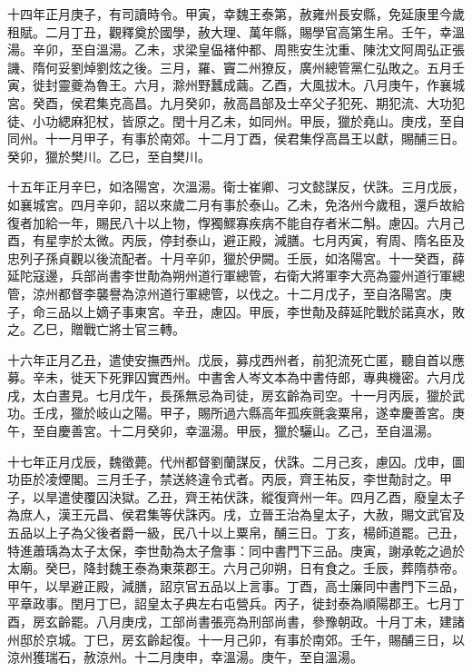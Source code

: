 \begin{pinyinscope}
 十四年正月庚子，有司讀時令。甲寅，幸魏王泰第，赦雍州長安縣，免延康里今歲租賦。二月丁丑，觀釋奠於國學，赦大理、萬年縣，賜學官高第生帛。壬午，幸溫湯。辛卯，至自溫湯。乙未，求梁皇偘褚仲都、周熊安生沈重、陳沈文阿周弘正張譏、隋何妥劉焯劉炫之後。三月，羅、竇二州獠反，廣州總管黨仁弘敗之。五月壬寅，徙封靈夔為魯王。六月，滁州野蠶成繭。乙酉，大風拔木。八月庚午，作襄城宮。癸酉，侯君集克高昌。九月癸卯，赦高昌部及士卒父子犯死、期犯流、大功犯徒、小功緦麻犯杖，皆原之。閏十月乙未，如同州。甲辰，獵於堯山。庚戌，至自同州。十一月甲子，有事於南郊。十二月丁酉，侯君集俘高昌王以獻，賜酺三日。癸卯，獵於樊川。乙巳，至自樊川。



 十五年正月辛巳，如洛陽宮，次溫湯。衛士崔卿、刁文懿謀反，伏誅。三月戊辰，如襄城宮。四月辛卯，詔以來歲二月有事於泰山。乙未，免洛州今歲租，還戶故給復者加給一年，賜民八十以上物，惸獨鰥寡疾病不能自存者米二斛。慮囚。六月己酉，有星孛於太微。丙辰，停封泰山，避正殿，減膳。七月丙寅，宥周、隋名臣及忠列子孫貞觀以後流配者。十月辛卯，獵於伊闕。壬辰，如洛陽宮。十一癸酉，薛延陀寇邊，兵部尚書李世勣為朔州道行軍總管，右衛大將軍李大亮為靈州道行軍總管，涼州都督李襲譽為涼州道行軍總管，以伐之。十二月戊子，至自洛陽宮。庚子，命三品以上嫡子事東宮。辛丑，慮囚。甲辰，李世勣及薛延陀戰於諾真水，敗之。乙巳，贈戰亡將士官三轉。



 十六年正月乙丑，遣使安撫西州。戊辰，募戍西州者，前犯流死亡匿，聽自首以應募。辛未，徙天下死罪囚實西州。中書舍人岑文本為中書侍郎，專典機密。六月戊戌，太白晝見。七月戊午，長孫無忌為司徒，房玄齡為司空。十一月丙辰，獵於武功。壬戌，獵於岐山之陽。甲子，賜所過六縣高年孤疾氈衾粟帛，遂幸慶善宮。庚午，至自慶善宮。十二月癸卯，幸溫湯。甲辰，獵於驪山。乙己，至自溫湯。



 十七年正月戊辰，魏徵薨。代州都督劉蘭謀反，伏誅。二月己亥，慮囚。戊申，圖功臣於凌煙閣。三月壬子，禁送終違令式者。丙辰，齊王祐反，李世勣討之。甲子，以旱遣使覆囚決獄。乙丑，齊王祐伏誅，縱復齊州一年。四月乙酉，廢皇太子為庶人，漢王元昌、侯君集等伏誅丙。戌，立晉王治為皇太子，大赦，賜文武官及五品以上子為父後者爵一級，民八十以上粟帛，酺三日。丁亥，楊師道罷。己丑，特進蕭瑀為太子太保，李世勣為太子詹事：同中書門下三品。庚寅，謝承乾之過於太廟。癸巳，降封魏王泰為東萊郡王。六月己卯朔，日有食之。壬辰，葬隋恭帝。甲午，以旱避正殿，減膳，詔京官五品以上言事。丁酉，高士廉同中書門下三品，平章政事。閏月丁巳，詔皇太子典左右屯營兵。丙子，徙封泰為順陽郡王。七月丁酉，房玄齡罷。八月庚戌，工部尚書張亮為刑部尚書，參豫朝政。十月丁未，建諸州邸於京城。丁巳，房玄齡起復。十一月己卯，有事於南郊。壬午，賜酺三日，以涼州獲瑞石，赦涼州。十二月庚申，幸溫湯。庚午，至自溫湯。




\end{pinyinscope}
